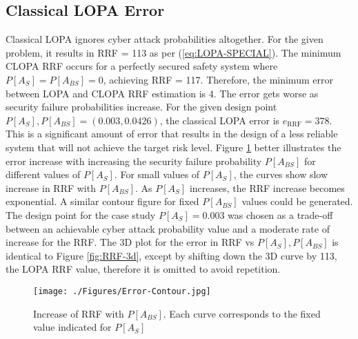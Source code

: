 \documentclass[journal]{IEEEtran}
\begin{document}
\subsection{Classical LOPA Error}
Classical LOPA ignores cyber attack probabilities altogether. For the given problem, it results in RRF = 113 as per (\ref{eq:LOPA-SPECIAL}). The minimum CLOPA RRF occurs for a perfectly secured safety system where $P[A_S]=P[A_{BS}]=0$, achieving RRF = 117. Therefore, the minimum error between LOPA and CLOPA RRF estimation is 4. The error gets worse as security failure probabilities increase. For the given design point $P[A_S],P[A_{BS}]=(0.003,0.0426)$, the classical LOPA error is $e_{\text{RRF}}=378$. This is a significant amount of error that results in the design of a less reliable system that will not achieve the target risk level. Figure \ref{fig:Error-Contour} better illustrates the error increase with increasing the security failure probability $P[A_{BS}]$ for different values of $P[A_S]$. For small values of $P[A_S]$, the curves show slow increase in RRF with $P[A_{BS}]$. As $P[A_S]$ increases, the RRF increase becomes exponential. A similar contour figure for fixed $P[A_{BS}]$ values could be generated. The design point for the case study $P[A_S]=0.003$ was chosen as a trade-off between an achievable cyber attack probability value and a moderate rate of increase for the RRF. The 3D plot for the error in RRF vs $P[A_S], P[A_{BS}]$ is identical to Figure \ref{fig:RRF-3d}, except by shifting down the 3D curve by 113, the LOPA RRF value, therefore it is omitted to avoid repetition.

\begin{figure}[]
\centering
\texttt{[image: ./Figures/Error-Contour.jpg]}
\caption{Increase of RRF with $P[A_{BS}]$. Each curve corresponds to the fixed value indicated for $P[A_S]$}
\label{fig:Error-Contour}
\end{figure}
\end{document}
